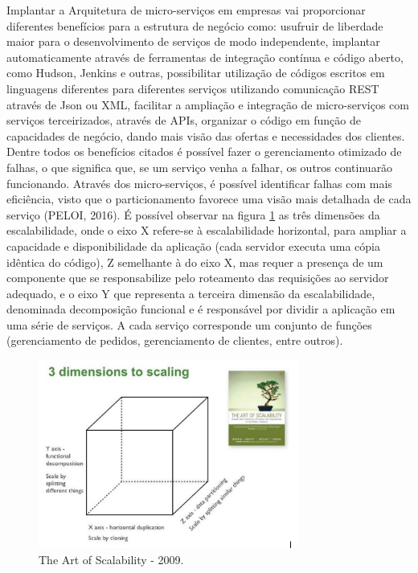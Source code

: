 Implantar a Arquitetura de micro-serviços em empresas vai proporcionar diferentes benefícios para a estrutura de negócio como: usufruir de liberdade maior para o desenvolvimento de serviços de modo independente, implantar automaticamente através de ferramentas de integração contínua e código aberto, como Hudson, Jenkins e outras, possibilitar utilização de códigos escritos em linguagens diferentes para diferentes serviços utilizando comunicação REST através de Json ou XML, facilitar a ampliação e integração de micro-serviços com serviços terceirizados, através de APIs, organizar o código em função de capacidades de negócio, dando mais visão das ofertas e necessidades dos clientes. Dentre todos os benefícios citados é possível fazer o gerenciamento otimizado de falhas, o que significa que, se um serviço venha a falhar, os outros continuarão funcionando. Através dos micro-serviços, é possível identificar falhas com mais eficiência, visto que o particionamento favorece uma visão mais detalhada de cada serviço (PELOI, 2016). É possível observar na figura \ref{fig:art-scalability} as três dimensões da escalabilidade, onde o eixo X refere-se à escalabilidade horizontal, para ampliar a capacidade e disponibilidade da aplicação (cada servidor executa uma cópia idêntica do código), Z semelhante à do eixo X,  mas requer a presença de um componente que se responsabilize pelo roteamento das requisições ao servidor adequado, e o eixo Y que representa a terceira dimensão da escalabilidade, denominada decomposição funcional e é responsável por dividir a aplicação em uma série de serviços. A cada serviço corresponde um conjunto de funções (gerenciamento de pedidos, gerenciamento de clientes, entre outros).

\begin{figure}[h]
\centering
\includegraphics[height=6.2cm]{imagens/scalability}
\caption{The Art of Scalability - 2009.}
\label{fig:art-scalability}
\end{figure}


